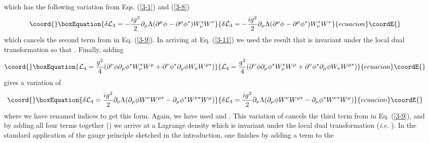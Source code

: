\documentclass[a4paper,aps]{revtex4}
\begin{document}
which has the following variation from Eqs.
(\ref{3-1}) and (\ref{3-8})
\begin{equation}\coord{}\boxEquation{
\label{3-11}
\delta {\cal L} _3 = -\frac{i g^2}{2} \partial _{\mu} \Lambda 
(\partial ^{\mu} \phi - \partial ^{\mu} \phi ^{\ast})
W_{\nu} ^{\ast} W^{\nu} 
}{
\delta {\cal L} _3 = -\frac{i g^2}{2} \partial _{\mu} \Lambda 
(\partial ^{\mu} \phi - \partial ^{\mu} \phi ^{\ast})
W_{\nu} ^{\ast} W^{\nu} 
}{ecuacion}\coordE{}\end{equation}
which cancels the second term from \coordHE{}
in Eq. (\ref{3-9}). In arriving at Eq. (\ref{3-11}) we used
the result that \coordHE{} is invariant under
the local dual transformation so that \coordHE{}. Finally, adding
\begin{equation}\coord{}\boxEquation{
\label{3-12}
{\cal L}_4 = \frac{g^2}{4} (\partial ^{\nu} \phi \partial _{\mu}
\phi ^{\ast} W_{\nu} ^{\ast} W^{\mu} +
\partial ^{\nu} \phi ^{\ast} \partial _{\mu}
\phi W_{\nu} W^{\mu \ast})
}{
{\cal L}_4 = \frac{g^2}{4} (\partial ^{\nu} \phi \partial _{\mu}
\phi ^{\ast} W_{\nu} ^{\ast} W^{\mu} +
\partial ^{\nu} \phi ^{\ast} \partial _{\mu}
\phi W_{\nu} W^{\mu \ast})
}{ecuacion}\coordE{}\end{equation}
gives a variation of
\begin{equation}\coord{}\boxEquation{
\label{3-13}
\delta {\cal L} _4 =\frac{i g^2}{2} \partial _{\nu} \Lambda
(\partial _{\mu} \phi W^{\nu} W^{\mu \ast} -
\partial _{\mu} \phi ^{\ast} W^{\nu \ast} W^{\mu} )
}{
\delta {\cal L} _4 =\frac{i g^2}{2} \partial _{\nu} \Lambda
(\partial _{\mu} \phi W^{\nu} W^{\mu \ast} -
\partial _{\mu} \phi ^{\ast} W^{\nu \ast} W^{\mu} )
}{ecuacion}\coordE{}\end{equation}
where we have renamed indices to get this form. Again, we
have used \coordHE{} and
\coordHE{}. This variation
of \coordHE{} cancels the third term from \coordHE{}
in Eq. (\ref{3-9}), and by adding all four terms together
(\coordHE{}) we
arrive at a Lagrange density which is invariant under the local
dual transformation ({\it i.e.} \coordHE{}). In the
standard application of the gauge principle sketched in the
introduction, one finishes by adding a term to the
\end{document}
